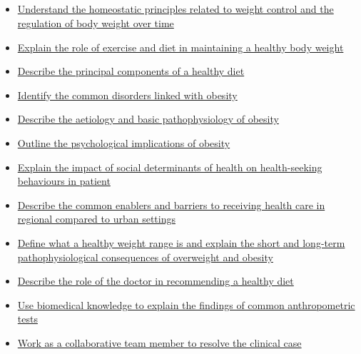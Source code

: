 \documentclass[10pt, a4paper]{article}
\begin{document}
\subsection{} \begin{itemize} \item \href{https://www.notion.so/322266107268411b8fa97a128c624904}{Understand the homeostatic principles related to weight control and the regulation of body weight over time} \item \href{https://www.notion.so/514222ea795d4a4a94eb78df11b7b6e7}{Explain the role of exercise and diet in maintaining a healthy body weight} \item \href{https://www.notion.so/1af92eceb56544cf89842afca7f95001}{Describe the principal components of a healthy diet} \item \href{https://www.notion.so/972e20853ce44ef8a411b42badbe55e6}{Identify the common disorders linked with obesity} \item \href{https://www.notion.so/e7f9eab601704caa82cf941dddb16c61}{Describe the aetiology and basic pathophysiology of obesity} \item \href{https://www.notion.so/a8acb3fb49614aad91cc98c0456ce53b}{Outline the psychological implications of obesity} \item \href{https://www.notion.so/21832dd272a54176bda57f3c60f6beef}{Explain the impact of social determinants of health on health-seeking behaviours in patient} \item \href{https://www.notion.so/1dff3750c18a491bb39275adc9b57ffb}{Describe the common enablers and barriers to receiving health care in regional compared to urban settings} \item \href{https://www.notion.so/cc622cdde41547ceab0563c3cf7875f5}{Define what a healthy weight range is and explain the short and long-term pathophysiological consequences of overweight and obesity} \item \href{https://www.notion.so/fe5db6f846474010a940b1465ce65c08}{Describe the role of the doctor in recommending a healthy diet} \item \href{https://www.notion.so/08f066e7993b429ab48f282fdc2a9825}{Use biomedical knowledge to explain the findings of common anthropometric tests} \item \href{https://www.notion.so/27989e800cb94487aad16575156680d8}{Work as a collaborative team member to resolve the clinical case} \end{itemize}
\end{document}
